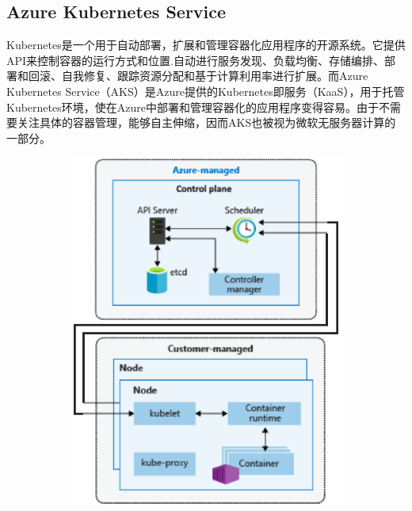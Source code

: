 \documentclass[11pt]{article}
\begin{document}
\subsection{Azure Kubernetes Service}
Kubernetes是一个用于自动部署，扩展和管理容器化应用程序的开源系统。它提供API来控制容器的运行方式和位置.自动进行服务发现、负载均衡、存储编排、部署和回滚、自我修复、跟踪资源分配和基于计算利用率进行扩展。而Azure Kubernetes Service（AKS）是Azure提供的Kubernetes即服务（KaaS），用于托管Kubernetes环境，使在Azure中部署和管理容器化的应用程序变得容易。由于不需要关注具体的容器管理，能够自主伸缩，因而AKS也被视为微软无服务器计算的一部分。
\begin{figure}[!htbp]
	\begin{subfigure}[b]{0.38\linewidth}
		\includegraphics[width=\linewidth]{figs/Kubernetes}
		\caption{}
		\label{figs:Structure}
	\end{subfigure}
	\begin{subfigure}[b]{0.62\linewidth}

\end{subfigure}
\end{figure}
\end{document}
